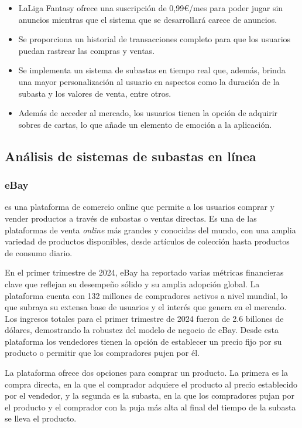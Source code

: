 \begin{itemize}
    \item LaLiga Fantasy ofrece una suscripción de 0,99€/mes para poder jugar sin anuncios mientras que el sistema que se desarrollará carece de anuncios.
    \item Se proporciona un historial de transacciones completo para que los usuarios puedan rastrear las compras y ventas.
    \item Se implementa un sistema de subastas en tiempo real que, además, brinda una mayor personalización al usuario en aspectos como la duración de la subasta y los valores de venta, entre otros.
    \item Además de acceder al mercado, los usuarios tienen la opción de adquirir sobres de cartas, lo que añade un elemento de emoción a la aplicación.
\end{itemize}



\subsection{Análisis de sistemas de subastas en línea}
\subsubsection{eBay}
 es una plataforma de comercio online que permite a los usuarios comprar y vender productos a través de subastas o ventas directas. 
Es una de las plataformas de venta \textit{online} más grandes y conocidas del mundo, con una amplia variedad de productos disponibles, desde artículos de colección hasta productos de consumo diario.

En el primer trimestre de 2024, eBay ha reportado varias métricas financieras clave \cite{ebay2024} que reflejan su desempeño sólido y su amplia adopción global. 
La plataforma cuenta con 132 millones de compradores activos a nivel mundial, lo que subraya su extensa base de usuarios y el interés que genera en el mercado.
Los ingresos totales para el primer trimestre de 2024 fueron de 2.6 billones de dólares, demostrando la robustez del modelo de negocio de eBay. 
Desde esta plataforma los vendedores tienen la opción de establecer un precio fijo por su producto o permitir que los compradores pujen por él.

La plataforma ofrece dos opciones para comprar un producto. La primera es la compra directa, en la que el comprador adquiere el producto al precio establecido por el vendedor, y la segunda es la subasta, en la que los compradores pujan por el producto y el comprador con la puja más alta al final del tiempo de la subasta se lleva el producto.

